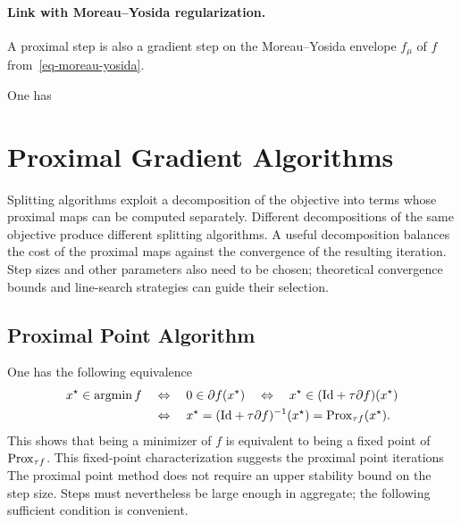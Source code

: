\paragraph{Link with Moreau--Yosida regularization.}

A proximal step is also a gradient step on the Moreau--Yosida envelope $f_\mu$ of $f$ from~\eqref{eq-moreau-yosida}.

\begin{prop}
	One has
\end{prop}


\section{Proximal Gradient Algorithms}

Splitting algorithms exploit a decomposition of the objective into terms whose proximal maps can be computed separately.
%
Different decompositions of the same objective produce different splitting algorithms. A useful decomposition balances the cost of the proximal maps against the convergence of the resulting iteration.
%
Step sizes and other parameters also need to be chosen; theoretical convergence bounds and line-search strategies can guide their selection.

\subsection{Proximal Point Algorithm}

One has the following equivalence 
\begin{align}\label{eq-proxpoint-fix}
	x^\star \in \operatorname{argmin} f
	&\quad\Leftrightarrow\quad
	0 \in \partial f(x^\star)
	\quad\Leftrightarrow\quad
	x^\star \in (\mathrm{Id}+\tau \partial f)(x^\star) \\
	&\quad\Leftrightarrow\quad
	x^\star = (\mathrm{Id}+\tau \partial f)^{-1}(x^\star) = \operatorname{Prox}_{\tau f}(x^\star).
\end{align}
This shows that being a minimizer of $f$ is equivalent to being a fixed point of $\operatorname{Prox}_{\tau f}$.
%
This fixed-point characterization suggests the proximal point iterations
The proximal point method does not require an upper stability bound on the step size. Steps must nevertheless be large enough in aggregate; the following sufficient condition is convenient.

